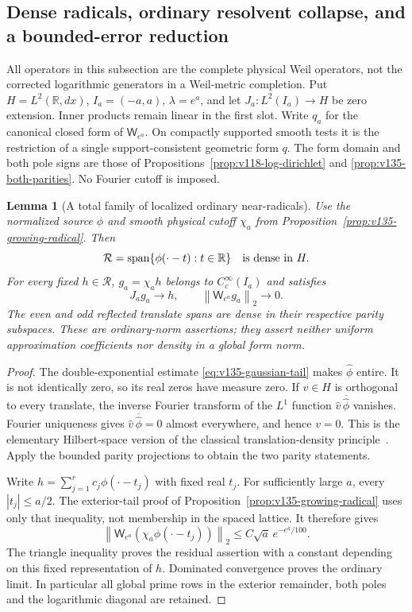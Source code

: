 \documentclass[11pt]{article}
\newtheorem{lemma}[theorem]{Lemma}
\theoremstyle{remark}
\newcommand{\norm}[1]{\left\lVert #1\right\rVert}
\begin{document}
\subsection*{Dense radicals, ordinary resolvent collapse, and a bounded-error reduction}

All operators in this subsection are the complete physical Weil operators,
not the corrected logarithmic generators in a Weil-metric completion.
Put $H=L^2(\mathbb R,dx)$, $I_a=(-a,a)$, $\lambda=e^a$, and let
$J_a:L^2(I_a)\to H$ be zero extension. Inner products remain linear in
the first slot. Write $q_a$ for the canonical closed form of
$\mathsf W_{e^a}$. On compactly supported smooth tests it is the
restriction of a single support-consistent geometric form $q$.
The form domain and both pole signs are those of
Propositions~\ref{prop:v118-log-dirichlet} and
\ref{prop:v135-both-parities}. No Fourier cutoff is imposed.

\begin{lemma}[A total family of localized ordinary near-radicals]
\label{lem:v136-total-radicals}
Use the normalized source $\phi$ and smooth physical cutoff $\chi_a$
from Proposition~\ref{prop:v135-growing-radical}. Then
\[
 \mathcal R=\operatorname{span}\{\phi(\cdot-t):t\in\mathbb R\}
 \quad\hbox{is dense in }H.
\]
For every fixed $h\in\mathcal R$, $g_a=\chi_a h$ belongs to
$C_c^\infty(I_a)$ and satisfies
\begin{equation}\label{eq:v136-dense-residual}
 J_ag_a\longrightarrow h,\qquad
 \norm{\mathsf W_{e^a}g_a}_2\longrightarrow0.
\end{equation}
The even and odd reflected translate spans are dense in their respective
parity subspaces. These are ordinary-norm assertions; they assert neither
uniform approximation coefficients nor density in a global form norm.
\end{lemma}
\begin{proof}
The double-exponential estimate \eqref{eq:v135-gaussian-tail} makes
$\widehat\phi$ entire. It is not identically zero, so its real zeros
have measure zero. If $v\in H$ is orthogonal to every translate, the
inverse Fourier transform of the $L^1$ function
$\widehat v\,\overline{\widehat\phi}$ vanishes. Fourier uniqueness
gives $\widehat v\,\overline{\widehat\phi}=0$ almost everywhere,
and hence $v=0$. This is the elementary Hilbert-space version of the
classical translation-density principle~\cite{Wiener1932}.
Apply the bounded parity projections to obtain the two parity statements.

Write $h=\sum_{j=1}^r c_j\phi(\cdot-t_j)$ with fixed real $t_j$.
For sufficiently large $a$, every $|t_j|\le a/2$. The exterior-tail
proof of Proposition~\ref{prop:v135-growing-radical} uses only that
inequality, not membership in the spaced lattice. It therefore gives
\[
 \norm{\mathsf W_{e^a}(\chi_a\phi(\cdot-t_j))}_2
 \le C\sqrt a\,e^{-e^a/100}.
\]
The triangle inequality proves the residual assertion with a constant
depending on this fixed representation of $h$. Dominated convergence
proves the ordinary limit. In particular all global prime rows in the
exterior remainder, both poles and the logarithmic diagonal are retained.
\end{proof}
\end{document}
